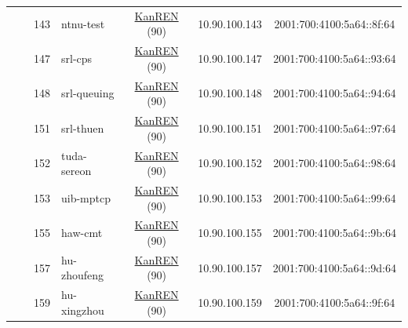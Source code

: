 \begin{small}
\begin{center}
\begin{longtable}{|c|c|c|c|c|c|c|c|}
  &  & \tiny{143} & \multicolumn{1}{|l|}{\tiny{ntnu-test}} & \multicolumn{2}{|c|}{\tiny{\href{http://www.kanren.net}{KanREN} (90)}} & \tiny{10.90.100.143} & \tiny{2001:700:4100:5a64::8f:64} \\* \cline{3-3}\cline{4-4}\cline{5-5}\cline{6-6}\cline{7-7}\cline{8-8}
  &  & \tiny{147} & \multicolumn{1}{|l|}{\tiny{srl-cps}} & \multicolumn{2}{|c|}{\tiny{\href{http://www.kanren.net}{KanREN} (90)}} & \tiny{10.90.100.147} & \tiny{2001:700:4100:5a64::93:64} \\* \cline{3-3}\cline{4-4}\cline{5-5}\cline{6-6}\cline{7-7}\cline{8-8}
  &  & \tiny{148} & \multicolumn{1}{|l|}{\tiny{srl-queuing}} & \multicolumn{2}{|c|}{\tiny{\href{http://www.kanren.net}{KanREN} (90)}} & \tiny{10.90.100.148} & \tiny{2001:700:4100:5a64::94:64} \\* \cline{3-3}\cline{4-4}\cline{5-5}\cline{6-6}\cline{7-7}\cline{8-8}
  &  & \tiny{151} & \multicolumn{1}{|l|}{\tiny{srl-thuen}} & \multicolumn{2}{|c|}{\tiny{\href{http://www.kanren.net}{KanREN} (90)}} & \tiny{10.90.100.151} & \tiny{2001:700:4100:5a64::97:64} \\* \cline{3-3}\cline{4-4}\cline{5-5}\cline{6-6}\cline{7-7}\cline{8-8}
  &  & \tiny{152} & \multicolumn{1}{|l|}{\tiny{tuda-sereon}} & \multicolumn{2}{|c|}{\tiny{\href{http://www.kanren.net}{KanREN} (90)}} & \tiny{10.90.100.152} & \tiny{2001:700:4100:5a64::98:64} \\* \cline{3-3}\cline{4-4}\cline{5-5}\cline{6-6}\cline{7-7}\cline{8-8}
  &  & \tiny{153} & \multicolumn{1}{|l|}{\tiny{uib-mptcp}} & \multicolumn{2}{|c|}{\tiny{\href{http://www.kanren.net}{KanREN} (90)}} & \tiny{10.90.100.153} & \tiny{2001:700:4100:5a64::99:64} \\* \cline{3-3}\cline{4-4}\cline{5-5}\cline{6-6}\cline{7-7}\cline{8-8}
  &  & \tiny{155} & \multicolumn{1}{|l|}{\tiny{haw-cmt}} & \multicolumn{2}{|c|}{\tiny{\href{http://www.kanren.net}{KanREN} (90)}} & \tiny{10.90.100.155} & \tiny{2001:700:4100:5a64::9b:64} \\* \cline{3-3}\cline{4-4}\cline{5-5}\cline{6-6}\cline{7-7}\cline{8-8}
  &  & \tiny{157} & \multicolumn{1}{|l|}{\tiny{hu-zhoufeng}} & \multicolumn{2}{|c|}{\tiny{\href{http://www.kanren.net}{KanREN} (90)}} & \tiny{10.90.100.157} & \tiny{2001:700:4100:5a64::9d:64} \\* \cline{3-3}\cline{4-4}\cline{5-5}\cline{6-6}\cline{7-7}\cline{8-8}
  &  & \tiny{159} & \multicolumn{1}{|l|}{\tiny{hu-xingzhou}} & \multicolumn{2}{|c|}{\tiny{\href{http://www.kanren.net}{KanREN} (90)}} & \tiny{10.90.100.159} & \tiny{2001:700:4100:5a64::9f:64} \\* \cline{3-3}\cline{4-4}\cline{5-5}\cline{6-6}\cline{7-7}\cline{8-8}

\end{longtable}
\end{center}
\end{small}
